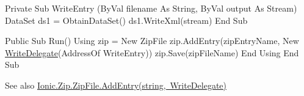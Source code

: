 \begin{DoxyCode}
Private Sub WriteEntry (ByVal filename As String, ByVal output As Stream)
    DataSet ds1 = ObtainDataSet()
    ds1.WriteXml(stream)
End Sub

Public Sub Run()
    Using zip = New ZipFile
        zip.AddEntry(zipEntryName, New \mbox{\hyperlink{namespace_super_tiled2_unity_1_1_ionic_1_1_zip_aa3bc35e889c4343c0028b310499c6886}{WriteDelegate}}(AddressOf WriteEntry))
        zip.Save(zipFileName)
    End Using
End Sub
\end{DoxyCode}
 

\begin{DoxySeeAlso}{See also}
\mbox{\hyperlink{class_super_tiled2_unity_1_1_ionic_1_1_zip_1_1_zip_file_a4db76147d4354e087063303abc6a4ec4}{Ionic.\+Zip.\+Zip\+File.\+Add\+Entry(string, Write\+Delegate)}}


\end{DoxySeeAlso}
